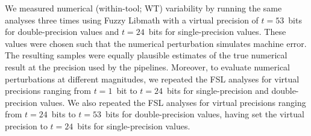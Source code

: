\documentclass[11pt,onecolumn]{article}
\begin{document}
We measured numerical (within-tool; WT) variability by running the same analyses three
times using Fuzzy Libmath with a virtual precision of $t=53$~bits for
double-precision values and $t=24$~bits for single-precision values. These
values were chosen such that the numerical perturbation simulates machine
error. The resulting samples were equally plausible estimates of
the true  numerical result at the precision used by the pipelines. Moreover, to evaluate numerical perturbations at different magnitudes,
we repeated the FSL analyses for virtual
precisions ranging from $t=1$~bit to $t=24$~bits for single-precision
and double-precision values. We also repeated the FSL analyses for virtual
precisions ranging from $t=24$~bits to $t=53$~bits for double-precision values, having
set the virtual precision to $t=24$~bits for single-precision values.
\end{document}
